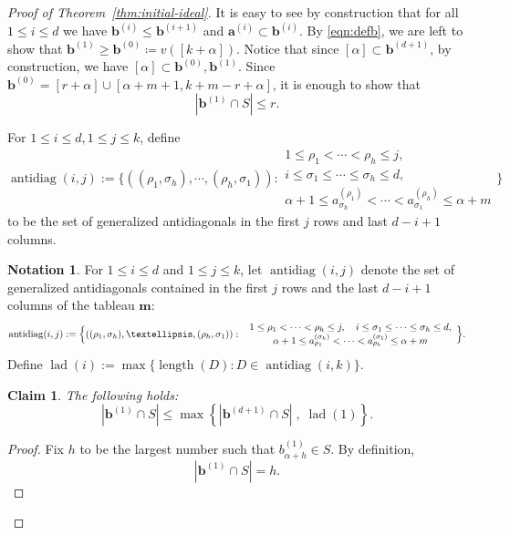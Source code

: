 \documentclass[12pt,reqno]{amsart}
\newtheorem{claim}[lemma]{Claim}
\theoremstyle{definition}
\newtheorem{notation}[lemma]{Notation}
\newcommand{\length}{\operatorname{length}}
\newcommand{\antidiag}{\operatorname{antidiag}}
\newcommand{\lad}{\operatorname{lad}}
\renewcommand{\aa}{\mathbf a}
\newcommand{\bb}{\mathbf b}
\newcommand{\mm}{\mathbf m}
\begin{document}
{\begin{proof}[Proof of Theorem~\ref{thm:initial-ideal}]
    It is easy to see by construction that for all $1\le i\le d$ we have $\bb^{(i)}\leq \bb^{(i+1)}$ and 
    $\aa^{(i)}\subset \bb^{(i)}$.
    By \eqref{eqn:defb}, we are left to show that $\bb^{(1)}\geq \bb^{(0)} \coloneqq v([k+\alpha])$.
    Notice that since $[\alpha]\subset \bb^{(d+1)}$, by construction, we have $[\alpha]\subset \bb^{(0)},\bb^{(1)}$. Since $\bb^{(0)} = [r+\alpha]\cup[\alpha+m+1,k+m-r+\alpha]$, it is enough to show that 
    \[|\bb^{(1)}\cap S |\leq r.\]

     For $1\le i\le d, 1\le j\le k$, define
\[\antidiag(i,j):=\Biggl\{ ((\rho_1,\sigma_h),\cdots, (\rho_h,\sigma_1)):\begin{array}{c}
    1\le \rho_1<\cdots < \rho_h\le j, \\
    i\le \sigma_1\leq \cdots\leq \sigma_h\le d,\\
    \alpha+1\le a^{(\rho_1)}_{\sigma_h}<\cdots<a^{(\rho_h)}_{\sigma_1}\le \alpha+m
\end{array}
         \Biggl\}
\]
    to be the set of generalized antidiagonals in the first $j$ rows and last $d-i+1$ columns.

\begin{notation}\label{not:lad}
For \(1\le i\le d\) and \(1\le j\le k\), let \(\antidiag(i,j)\) denote the set of generalized antidiagonals
contained in the first \(j\) rows and the last \(d-i+1\) columns of the tableau \(\mm\):
\[
\antidiag(i,j):=\Bigl\{((\rho_1,\sigma_h),\dots,(\rho_h,\sigma_1)):\ 
\begin{array}{c}
1\le \rho_1<\cdots<\rho_h\le j,\quad i\le \sigma_1\le\cdots\le \sigma_h\le d,\\
\alpha+1\le a^{(\sigma_h)}_{\rho_1}<\cdots<a^{(\sigma_1)}_{\rho_h}\le \alpha+m
\end{array}
\Bigr\}.
\]
Define \(\lad(i):=\max\{\length(D): D\in \antidiag(i,k)\}\).
\end{notation}



    \begin{claim}
    \label{claim:b-size}
    The following holds:
    \begin{equation}\label{eqn:lad}
        |\bb^{(1)}\cap S |\le \max \left \{|\bb^{(d+1)}\cap S| \; , \; \lad(1) \right\}.
    \end{equation}
    \end{claim}

    \begin{proof}
        Fix $h$ to be the largest number such that $b^{(1)}_{\alpha+h}\in S$. By definition,
        \begin{equation}\label{eqn:Apr25ccc}
            |\bb^{(1)}\cap S|=h.
        \end{equation}


\end{proof}
\end{proof}}
\end{document}
